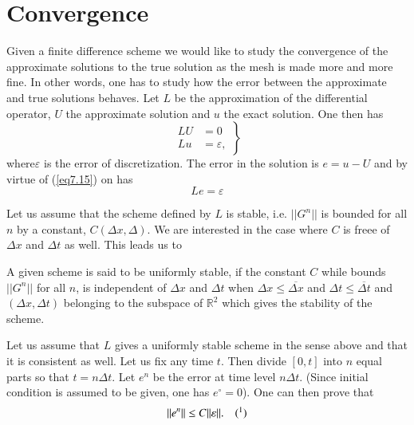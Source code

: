 \section{Convergence}\label{chap7:sec7.5}

Given a finite difference scheme we would like  to study the
convergence of the approximate solutions to the true solution as the
mesh is made more and more fine. In other words, one has to study how
the error between the approximate and true solutions behaves. Let $L$
be the approximation of the differential operator, $U$ the approximate
solution and $u$ the exact solution. One then has
\begin{equation*}
\left. 
\begin{aligned}
LU & = 0\\
Lu & = \varepsilon,
\end{aligned}
\right\}\tag{7.15}\label{eq7.15}
\end{equation*}
where\pageoriginale $\varepsilon$ is the error of discretization. The error in the
solution is $e = u- U$ and by virtue of (\ref{eq7.15}) on has 
\begin{equation*}
Le= \varepsilon\tag{7.16}\label{eq7.16}
\end{equation*}

Let us assume that the scheme defined by $L$ is stable, i.e. $||G^n||$
is bounded for all $n$ by a constant, $C(\Delta x, \Delta)$. We are
interested in the case where $C$ is freee of $\Delta x$ and $\Delta t$
as well. This leads us to 

\begin{Definition}\label{chap7:def7.3}
A given scheme is said to be uniformly stable, if the constant $C$
while bounds $||G^n||$ for all $n$, is independent of $\Delta x$ and
$\Delta t$ when $\Delta x \leq \overline{\Delta x}$ and $\Delta t \leq
\overline{\Delta t}$ and $(\Delta x, \Delta  t)$ belonging to the
subspace of $\mathbb{R}^2$ which gives the stability of the scheme. 
\end{Definition}

Let us assume that $L$ gives a uniformly stable scheme in the sense
above and that it is consistent as well. Let us fix any time $t$. Then
divide $[0,t]$ into $n$ equal parts so that $t = n \Delta t$. Let
$e^n$ be the error at time level $n\Delta t$. (Since initial condition
is assumed to be given, one has $e^\circ = 0$). One can then prove
that 
$$
||e^n|| \leq C||\varepsilon||. \quad (\footnotemark[1]{})
$$

